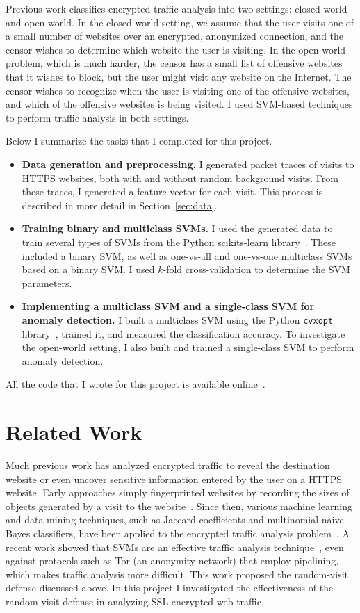 \documentclass[10pt, twocolumn]{article}
\begin{document}
Previous work classifies encrypted traffic analysis into two settings: 
closed world and open world. In the closed world setting, we assume that 
the user visits one of a small number of websites over an encrypted, 
anonymized connection, and the censor wishes to determine which website 
the user is visiting. In the open world problem, which is much harder, the 
censor has a small list of offensive websites that it wishes to block, but 
the user might visit any website on the Internet. The censor wishes to 
recognize when the user is visiting one of the offensive websites, and which 
of the offensive websites is being visited. I used SVM-based techniques to 
perform traffic analysis in both settings.

Below I summarize the tasks that I completed for this project.
\begin{itemize}
\item \textbf{Data generation and preprocessing.} I generated packet 
traces of visits to HTTPS websites, both with and without random 
background visits. From these traces, I generated a feature vector for 
each visit. This process is described in more detail in Section~\ref{sec:data}. 
\item \textbf{Training binary and multiclass SVMs.} I used the 
generated data to train several types of SVMs from the Python scikits-learn 
library~\cite{sklearn}. These included a binary SVM, as well as one-vs-all
and one-vs-one multiclass SVMs based on a binary SVM. I used $k$-fold cross-validation 
to determine the SVM parameters.
\item \textbf{Implementing a multiclass SVM and a single-class SVM for anomaly detection.} 
I built a multiclass SVM using the Python \texttt{cvxopt} library~\cite{cvxopt}, 
trained it, and measured the classification accuracy. To investigate the 
open-world setting, I also built and trained a single-class SVM to perform 
anomaly detection.
\end{itemize}

All the code that I wrote for this project is available online~\cite{github}.

\section{Related Work}

Much previous work has analyzed encrypted traffic to reveal the destination website or 
even uncover sensitive information entered by the user on a HTTPS website. Early
approaches simply fingerprinted websites by recording the sizes of objects generated 
by a visit to the website~\cite{safeweb}. Since then, various machine learning 
and data mining techniques, such as Jaccard coefficients and multinomial naive Bayes classifiers,
have been applied to the encrypted traffic analysis problem~\cite{herrmann,liberatore}. 
A recent work showed that SVMs are an effective traffic analysis technique~\cite{tor}, even 
against protocols such as Tor (an anonymity network) that employ pipelining, which makes 
traffic analysis more difficult. This work proposed the random-visit defense discussed above. In 
this project I investigated the effectiveness of the random-visit defense in analyzing 
SSL-encrypted web traffic.
\end{document}
